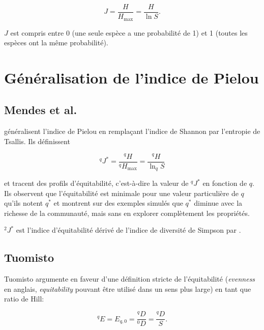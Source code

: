 \documentclass[
  11pt,
  french,
  a4paper,
  extrafontsizes,onecolumn,openright
  ]{memoir}
\begin{document}
\begin{equation}
  \label{eq:JPielou}
  J = \frac{H}{H_{\max}} = \frac{H}{\ln S}.
\end{equation}

\(J\) est compris entre 0 (une seule espèce a une probabilité de 1) et 1 (toutes les espèces ont la même probabilité).

\section{Généralisation de l'indice de Pielou}\label{guxe9nuxe9ralisation-de-lindice-de-pielou}

\subsection{Mendes et al.~}\label{sec-Mendes}

\textcite{Mendes2008} généralisent l'indice de Pielou en remplaçant l'indice de Shannon par l'entropie de Tsallis.
Ils définissent

\begin{equation}
  \label{eq:JMendes2008}
  ^{q}\!J^{*} = \frac{^{q}\!H}{^{q}H_{\max}} = \frac{^{q}\!H}{\ln_q{S}}
\end{equation}

et tracent des profils d'équitabilité, c'est-à-dire la valeur de \(^{q}\!J^{*}\) en fonction de \(q\).
Ils observent que l'équitabilité est minimale pour une valeur particulière de \(q\) qu'ils notent \(q^*\) et montrent sur des exemples simulés que \(q^*\) diminue avec la richesse de la communauté, mais sans en explorer complètement les propriétés.

\(^{2}\!J^{*}\) est l'indice d'équitabilité dérivé de l'indice de diversité de Simpson par \textcite{Hurlbert1971}.

\subsection{Tuomisto}\label{tuomisto}

Tuomisto argumente en faveur d'une définition stricte de l'équitabilité (\emph{evenness} en anglais, \emph{equitability} pouvant être utilisé dans un sens plus large) en tant que ratio de Hill:

\begin{equation}
  \label{eq:TuomistoEq}
  ^{q}\!E = E_{q,0}
  = \frac{^{q}\!D}{^{0}\!D}
  = \frac{^{q}\!D}{S}.
\end{equation}
\end{document}
